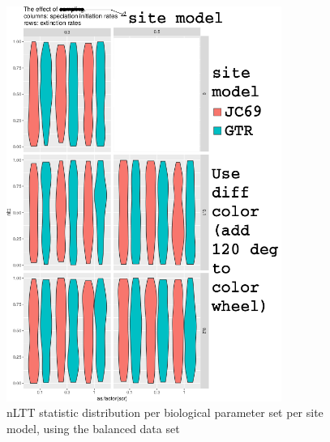 \documentclass{article}
\begin{document}
\begin{figure}[!htbp]
  \includegraphics[width=0.8\textwidth]{fig_site_model.png}
  \caption{
    nLTT statistic distribution per biological parameter set per site model,
    using the balanced data set 
  }
\end{figure}
\end{document}
